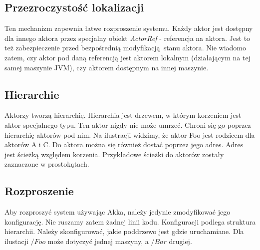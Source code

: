 \documentclass[oneside, 12pt, a4paper]{article}
\begin{document}
\begin{multicols}{2}
\subsection{Przezroczystość lokalizacji}
Ten mechanizm zapewnia łatwe rozproszenie systemu. Każdy aktor jest dostępny dla innego aktora przez specjalny obiekt \emph{ActorRef} - referencja na aktora. Jest to też zabezpieczenie przed bezpośrednią modyfikacją stanu aktora. Nie wiadomo zatem, czy aktor pod daną referencją jest aktorem lokalnym (działającym na tej samej maszynie JVM), czy aktorem dostępnym na innej maszynie.

\subsection{Hierarchie}
Aktorzy tworzą hierarchię. Hierarchia jest drzewem, w którym korzeniem jest aktor specjalnego typu. Ten aktor nigdy nie może umrzeć. Chroni się go poprzez hierarchię aktorów pod nim. Na ilustracji widzimy, że aktor Foo jest rodzicem dla aktorów A i C. Do aktora można się również dostać poprzez jego adres. Adres jest ścieżką względem korzenia. Przykładowe ścieżki do aktorów zostały zaznaczone w prostokątach.


 \begin{figure}[H]
\end{figure}

\subsection{Rozproszenie}
Aby rozproszyć system używając \mbox{Akka}, należy jedynie zmodyfikować jego konfigurację. Nie ruszamy zatem żadnej linii kodu. Konfiguracji podlega struktura hierarchii. Należy skonfigurować, jakie poddrzewo jest gdzie uruchamiane. Dla ilustacji $/Foo$ może dotyczyć jednej maszyny, a $/Bar$ drugiej. 


\end{multicols}
\end{document}
